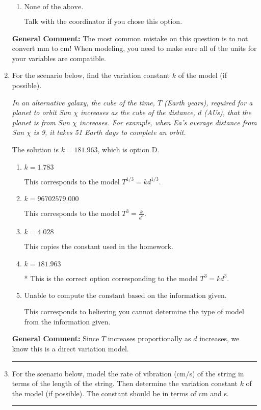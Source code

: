 \documentclass{extbook}[14pt]
\newcommand{\litem}[1]{\item #1

\rule{\textwidth}{0.4pt}}
\begin{document}
\begin{enumerate}
{\begin{enumerate}[label=\Alph*.]
This option uses the correct model, $R = \frac{k}{l^{4}}$, but does not convert from mm to cm so that the units match.
\item \( \text{None of the above.} \)

Talk with the coordinator if you chose this option.
\end{enumerate}

\textbf{General Comment:} The most common mistake on this question is to not convert mm to cm! When modeling, you need to make sure all of the units for your variables are compatible.
}
\litem{
For the scenario below, find the variation constant $k$ of the model (if possible).

\begin{center}
    \textit{ In an alternative galaxy, the cube of the time, $T$ (Earth years), required for a planet to orbit Sun $\chi$ increases as the cube of the distance, $d$ (AUs), that the planet is from Sun $\chi$ increases. For example, when Ea's average distance from Sun $\chi$ is 9, it takes 51 Earth days to complete an orbit. }
\end{center}
The solution is \( k = 181.963 \), which is option D.\begin{enumerate}[label=\Alph*.]
\item \( k = 1.783 \)

This corresponds to the model $T^{1/3} = k d^{1/3}$.
\item \( k = 96702579.000 \)

This corresponds to the model $T^{3} = \frac{k}{d^{3}}$.
\item \( k = 4.028 \)

This copies the constant used in the homework.
\item \( k = 181.963 \)

* This is the correct option corresponding to the model $T^{3} = k d^{3}$.
\item \( \text{Unable to compute the constant based on the information given.} \)

This corresponds to believing you cannot determine the type of model from the information given.
\end{enumerate}

\textbf{General Comment:} Since $T$ increases proportionally as $d$ increases, we know this is a direct variation model.
}
\litem{
For the scenario below, model the rate of vibration (cm/s) of the string in terms of the length of the string. Then determine the variation constant $k$ of the model (if possible). The constant should be in terms of cm and s.

}
\end{enumerate}
\end{document}
